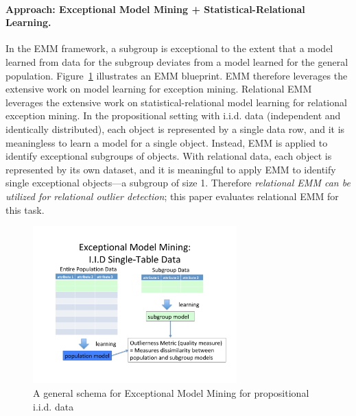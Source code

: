 {\paragraph{Approach: Exceptional Model Mining + Statistical-Relational Learning.} In the EMM framework, a subgroup is exceptional to the extent that a model learned from data for the subgroup deviates from a model learned for the general population. Figure~\ref{fig:emm} illustrates an EMM blueprint. EMM therefore leverages the extensive work on model learning for exception mining. Relational EMM leverages the extensive work on statistical-relational model learning for relational exception mining. In the propositional setting with i.i.d. data (independent and identically distributed), each object is represented by a single data row, and it is meaningless to learn a model for a single object. Instead, EMM is applied to identify exceptional subgroups of objects. With relational data, each object is represented by its own dataset, and it is meaningful to apply EMM to identify single exceptional objects---a subgroup of size 1. Therefore {\em relational EMM can be utilized for relational outlier detection}; this paper evaluates relational EMM for this task.

\begin{figure}[thbp]
\centering
\includegraphics[width=0.7\textwidth]
{emm.pdf}
\caption{A general schema for Exceptional Model Mining  for propositional i.i.d. data
\label{fig:emm}}
\end{figure}

}
